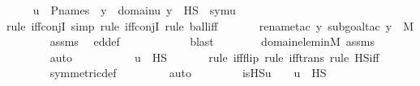 \begin{isabellebody}
\ \isamarkupfalse%
\ {\isachardoublequoteopen}{\isachardot}{\kern0pt}{\isachardot}{\kern0pt}{\isachardot}{\kern0pt}\ {\isasymlongleftrightarrow}\ u\ {\isasymin}\ P{\isacharunderscore}{\kern0pt}names\ {\isasymand}\ {\isacharparenleft}{\kern0pt}{\isasymforall}y\ {\isasymin}\ domain{\isacharparenleft}{\kern0pt}u{\isacharparenright}{\kern0pt}{\isachardot}{\kern0pt}\ y\ {\isasymin}\ HS{\isacharparenright}{\kern0pt}\ {\isasymand}\ sym{\isacharparenleft}{\kern0pt}u{\isacharparenright}{\kern0pt}\ {\isasymin}\ {\isasymF}{\isachardoublequoteclose}\ \isanewline
\ \ \ \ \ \ \isamarkupfalse%
{\isacharparenleft}{\kern0pt}rule\ iff{\isacharunderscore}{\kern0pt}conjI{\isacharcomma}{\kern0pt}\ simp{\isacharcomma}{\kern0pt}\ rule\ iff{\isacharunderscore}{\kern0pt}conjI{\isacharcomma}{\kern0pt}\ rule\ ball{\isacharunderscore}{\kern0pt}iff{\isacharparenright}{\kern0pt}\isanewline
\ \ \ \ \ \ \isamarkupfalse%
{\isacharparenleft}{\kern0pt}rename{\isacharunderscore}{\kern0pt}tac\ y{\isacharcomma}{\kern0pt}\ subgoal{\isacharunderscore}{\kern0pt}tac\ {\isachardoublequoteopen}y\ {\isasymin}\ M{\isachardoublequoteclose}{\isacharparenright}{\kern0pt}\isanewline
\ \ \ \ \ \ \isamarkupfalse%
\ assms{}\ \isamarkupfalse%
\ ed{\isacharunderscore}{\kern0pt}def\ \ \isanewline
\ \ \ \ \ \ \ \ \isamarkupfalse%
\ blast\isanewline
\ \ \ \ \ \ \isamarkupfalse%
\ domain{\isacharunderscore}{\kern0pt}elem{\isacharunderscore}{\kern0pt}in{\isacharunderscore}{\kern0pt}M\ assms{}\ \isanewline
\ \ \ \ \ \ \isamarkupfalse%
\ auto\ \isanewline
\ \ \ \ \isamarkupfalse%
\ \isamarkupfalse%
\ {\isachardoublequoteopen}{\isachardot}{\kern0pt}{\isachardot}{\kern0pt}{\isachardot}{\kern0pt}\ {\isasymlongleftrightarrow}\ u\ {\isasymin}\ HS{\isachardoublequoteclose}\isanewline
\ \ \ \ \ \ \isamarkupfalse%
{\isacharparenleft}{\kern0pt}rule\ iff{\isacharunderscore}{\kern0pt}flip{\isacharcomma}{\kern0pt}\ rule\ iff{\isacharunderscore}{\kern0pt}trans{\isacharcomma}{\kern0pt}\ rule\ HS{\isacharunderscore}{\kern0pt}iff{\isacharparenright}{\kern0pt}\isanewline
\ \ \ \ \ \ \isamarkupfalse%
\ symmetric{\isacharunderscore}{\kern0pt}def\ \isanewline
\ \ \ \ \ \ \isamarkupfalse%
\ auto\ \isanewline
\ \ \ \ \isamarkupfalse%
\ \isamarkupfalse%
\ {\isachardoublequoteopen}is{\isacharunderscore}{\kern0pt}HS{\isacharparenleft}{\kern0pt}u{\isacharparenright}{\kern0pt}\ {\isacharequal}{\kern0pt}\ {}\ {\isasymlongleftrightarrow}\ u\ {\isasymin}\ HS{\isachardoublequoteclose}\ \isamarkupfalse%

\end{isabellebody}
